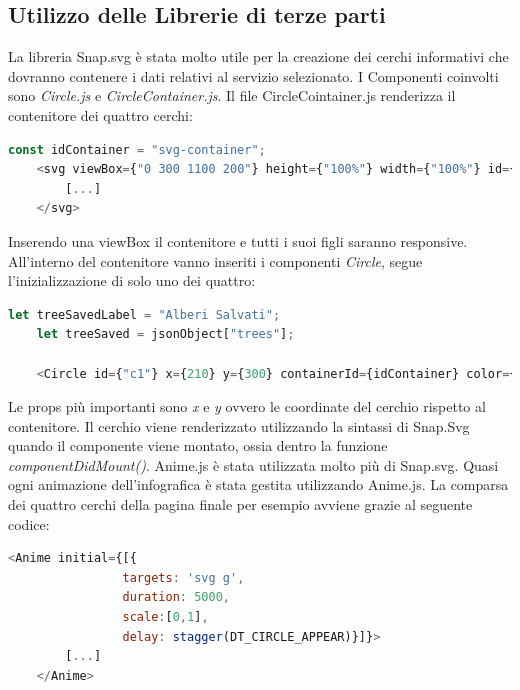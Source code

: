 \subsection{Utilizzo delle Librerie di terze parti}
\noindent La libreria Snap.svg è stata molto utile per la creazione dei cerchi informativi che dovranno contenere i dati relativi al servizio selezionato. I Componenti coinvolti sono \textit{Circle.js} e \textit{CircleContainer.js}.\newline
Il file CircleCointainer.js renderizza il contenitore dei quattro cerchi:
\begin{lstlisting}[language=Javascript]
    const idContainer = "svg-container";
    <svg viewBox={"0 300 1100 200"} height={"100%"} width={"100%"} id={idContainer}>
        [...]
    </svg>
\end{lstlisting}  
Inserendo una viewBox il contenitore e tutti i suoi figli saranno responsive.\newline
All'interno del contenitore vanno inseriti i componenti \textit{Circle}, segue l'inizializzazione di solo uno dei quattro:
\begin{lstlisting}[language=Javascript]
    let treeSavedLabel = "Alberi Salvati";
    let treeSaved = jsonObject["trees"];
    
    <Circle id={"c1"} x={210} y={300} containerId={idContainer} color={Colors.Green} radius={100}title={treeSaved} text={treeSavedLabel} textColor={Colors.White}/>
\end{lstlisting}
Le props più importanti sono \textit{x} e \textit{y} ovvero le coordinate del cerchio rispetto al contenitore.\newline
Il cerchio viene renderizzato utilizzando la sintassi di Snap.Svg quando il componente viene montato, ossia dentro la funzione \textit{componentDidMount()}.\newline\newline
Anime.js è stata utilizzata molto più di Snap.svg. Quasi ogni animazione dell'infografica è stata gestita utilizzando Anime.js.
La comparsa dei quattro cerchi della pagina finale per esempio avviene grazie al seguente codice:
\begin{lstlisting}[language=Javascript]
    <Anime initial={[{
                targets: 'svg g',
                duration: 5000,
                scale:[0,1],
                delay: stagger(DT_CIRCLE_APPEAR)}]}>
        [...]
    </Anime>
\end{lstlisting}

